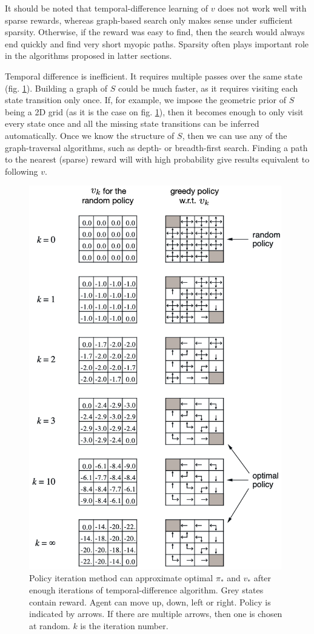 \documentclass[12pt]{article}
\begin{document}
It should be noted that temporal-difference learning of $v$ does not work well with sparse rewards, whereas graph-based search only makes sense under sufficient sparsity. Otherwise, if the reward was easy to find, then the search would always end quickly and find very short myopic paths. Sparsity often plays important role in the algorithms proposed in latter sections.

Temporal difference is inefficient. It requires multiple passes over the same state (fig. \ref{fig:dynamic_programming}). Building a graph of $S$ could be much faster, as it requires visiting each state transition only once. If, for example, we impose the geometric prior of $S$ being a 2D grid (as it is the case on fig. \ref{fig:dynamic_programming}), then it becomes enough to only visit every state once and all the missing state transitions can be inferred automatically. Once we know the structure of $S$, then we can use any of the graph-traversal algorithms, such as depth- or breadth-first search. Finding a path to the nearest (sparse) reward will with high probability give results equivalent to following $v$.
\begin{figure}[!htbp]
	\centering
	\includegraphics[width=11cm]{dynamic_programming}
	\caption{Policy iteration method can approximate optimal $\pi_*$ and $v_*$ after enough iterations of temporal-difference algorithm. Grey states contain reward. Agent can move up, down, left or right. Policy is indicated by arrows. If there are multiple arrows, then one is chosen at random. $k$ is the iteration number.}
	\label{fig:dynamic_programming}
\end{figure}
\end{document}
